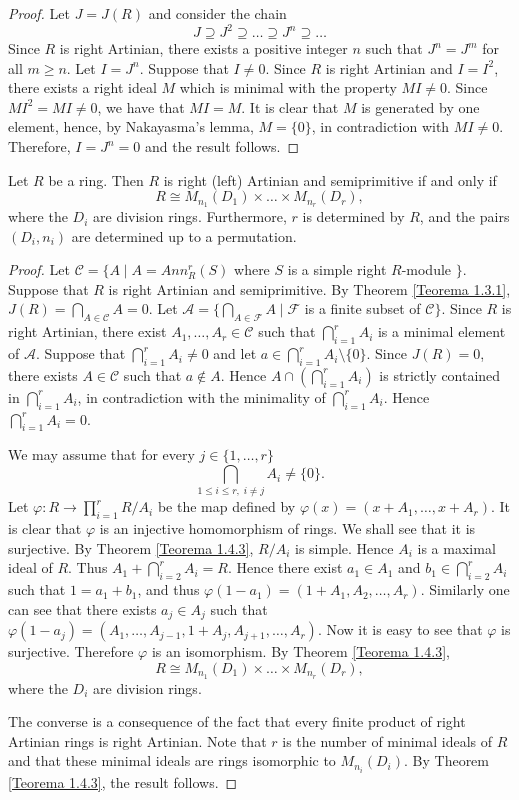 \begin{proof}
Let $J=J(R)$ and consider the chain
$$J\supseteq J^2\supseteq\dots\supseteq J^n\supseteq\dots$$
Since $R$ is right Artinian, there exists a positive integer $n$
such that $J^n=J^m$ for all $m\geq n$. Let $I=J^n$. Suppose that
$I\neq 0$. Since $R$ is right Artinian and $I=I^2$, there exists a right ideal $M$ which is minimal with the property
$MI\neq 0$. Since $MI^2=MI\neq 0$,
we have that $MI=M$. It is clear that $M$ is generated by one element, hence, by Nakayasma's lemma, $M=\{0\}$, in contradiction with $MI\neq 0$. Therefore,
$I=J^n=0$ and the result follows.
\end{proof}

\begin{theorem}
Let $R$ be a ring. Then $R$ is right (left) Artinian and semiprimitive if and only if
$$R\cong M_{n_1}(D_1)\times \dots\times M_{n_r}(D_r),$$
where the $D_i$ are division rings. Furthermore, $r$ is determined by $R$, and the pairs $(D_i,n_i)$ are determined up to a permutation.
\end{theorem}

\begin{proof}
Let $\mathcal{C}=\{ A\mid A=Ann^r_R(S)$ where $S$ is a simple right $R$-module $\}$. Suppose that $R$ is right Artinian and semiprimitive.
By Theorem \ref{Teorema 1.3.1}, $J(R)=\bigcap_{A\in\mathcal{C}}A=0$. Let $\mathcal{A}=\{\bigcap_{A\in \mathcal{F}}A \mid \mathcal{F}$ is a finite subset of $\mathcal{C}\}$. Since $R$ is right Artinian, there exist $A_1,\dots,A_r\in \mathcal{C}$ such that
$\bigcap_{i=1}^rA_i$ is a minimal element of $\mathcal{A}$. Suppose that
$\bigcap_{i=1}^rA_i\neq 0$ and let $a\in\bigcap_{i=1}^rA_i\setminus\{ 0\}$.
Since $J(R)=0$, there exists $A\in \mathcal{C}$ such that $a\notin A$. Hence $A\cap (\bigcap_{i=1}^rA_i)$ is strictly contained in $\bigcap_{i=1}^rA_i$, in contradiction with the minimality of $\bigcap_{i=1}^rA_i$. Hence $\bigcap_{i=1}^rA_i=0$.

We may assume that for every $j\in\{ 1,\dots ,r\}$  
$$\bigcap_{1\leq i\leq r,\;
i\neq j}A_i\neq \{0\}.$$
Let $\varphi\colon R\rightarrow \prod_{i=1}^rR/A_i$ be the map defined by
$\varphi(x)=(x+A_1,\dots,x+A_r)$. It is clear that $\varphi$ is an injective homomorphism of rings. We shall see that it is surjective. By Theorem \ref{Teorema 1.4.3},
$R/A_i$ is simple. Hence $A_i$ is a maximal ideal of $R$. Thus
$A_1+\bigcap_{i=2}^rA_i=R$. Hence there exist $a_1\in A_1$ and
$b_1\in\bigcap_{i=2}^rA_i$ such that $1=a_1+b_1$, and thus $\varphi
(1-a_1)=(1+A_1,A_2,\dots ,A_r)$. Similarly one can see that there exists $a_j\in A_j$ such that
$\varphi(1-a_j)=(A_1,\dots ,A_{j-1},1+A_j,A_{j+1},\dots, A_r)$. Now it is easy to see that $\varphi$ is surjective.
Therefore $\varphi$ is an isomorphism. By Theorem \ref{Teorema 1.4.3},
$$R\cong M_{n_1}(D_1)\times\dots\times M_{n_r}(D_r),$$
where the $D_i$ are division rings.

The converse is a consequence of the fact that every finite product of right Artinian rings is right Artinian. 
Note that  $r$ is the number of minimal ideals of $R$ and that these minimal ideals are rings isomorphic to $M_{n_i}(D_i)$.
By Theorem \ref{Teorema 1.4.3}, the result follows.
\end{proof}

